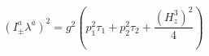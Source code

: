 \begin{equation}
\label{13}\left( I_{\pm }^a\lambda ^a\right) ^2=g^2\left( p_1^2\tau
_1+p_2^2\tau _2+\frac{\left( H_z^3\right) ^2}4\right) 
\end{equation}

